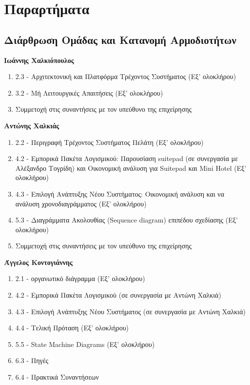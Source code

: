 \chapter{Παραρτήματα}
		
\section{Διάρθρωση Ομάδας και Κατανομή Αρμοδιοτήτων}

\noindent
\textbf{Ιωάννης Χαλκιόπουλος}
\begin{enumerate}
	\item 2.3 - Αρχιτεκτονική και Πλατφόρμα Τρέχοντος Συστήματος  (Εξ’ ολοκλήρου)
	\item 3.2 - Μή Λειτουργικές Απαιτήσεις  (Εξ’ ολοκλήρου)
	\item Συμμετοχή στις συναντήσεις με τον υπεύθυνο της επιχείρησης
\end{enumerate}

\noindent
\textbf{Αντώνης Χαλκιάς}
\begin{enumerate}
\item 2.2 - Περιγραφή Τρέχοντος Συστήματος Πελάτη (Εξ’ ολοκλήρου)
\item 4.2 - Εμπορικά Πακέτα Λογισμικού: Παρουσίαση suitepad (σε συνεργασία με Αλέξανδρο Τογρίδη) και Οικονομική ανάλυση για Suitepad και 
			Mini Hotel (Εξ’ ολοκλήρου)
\item 4.3 - Επιλογή Ανάπτυξης Νέου Συστήματος: Οικονομική ανάλυση και να ανάλυση χρονοδιαγράμματος (Εξ’ ολοκλήρου)
\item 5.3 - Διαγράμματα Ακολουθίας (Sequence diagram) επιπέδου σχεδίασης (Εξ’ ολοκλήρου)
\item Συμμετοχή στις συναντήσεις με τον υπεύθυνο της επιχείρησης
\end{enumerate}

\noindent
\textbf{Άγγελος Κοντογιάννης}
\begin{enumerate}
	\item 2.1 - οργανωτικό διάγραμμα (Εξ’ ολοκλήρου)
	\item 4.2 - Εμπορικά Πακέτα Λογισμικού (σε συνεργασία με Αντώνη Χαλκιά)
	\item 4.3 - Επιλογή Ανάπτυξης Νέου Συστήματος (σε συνεργασία με Αντώνη Χαλκιά)
	\item 4.4 - Τελική Πρόταση (Εξ’ ολοκλήρου)
	\item 5.5 - State Machine Diagrams (Εξ’ ολοκλήρου)
	\item 6.3 - Πηγές
	\item 6.4 - Πρακτικά Συναντήσεων
\end{enumerate}

